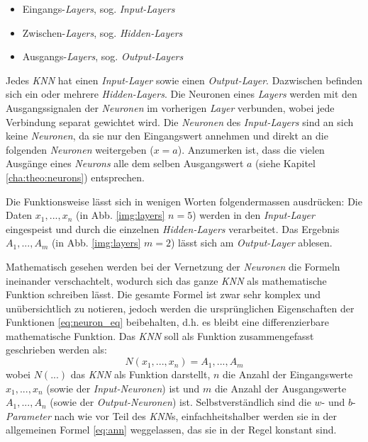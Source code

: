 \begin{itemize}
	\item Eingangs-\textit{Layers}, sog. \textit{Input-Layers}
	\item Zwischen-\textit{Layers}, sog. \textit{Hidden-Layers}
	\item Ausgangs-\textit{Layers}, sog. \textit{Output-Layers}
\end{itemize}
Jedes \textit{KNN} hat einen \textit{Input-Layer} sowie einen \textit{Output-Layer}. Dazwischen befinden sich ein oder mehrere \textit{Hidden-Layers}. Die Neuronen eines \textit{Layers} werden mit den Ausgangssignalen der \textit{Neuronen} im vorherigen \textit{Layer} verbunden, wobei jede Verbindung separat gewichtet wird. Die \textit{Neuronen} des \textit{Input-Layers} sind an sich keine \textit{Neuronen}, da sie nur den Eingangswert annehmen und direkt an die folgenden \textit{Neuronen} weitergeben ($x = a$). Anzumerken ist, dass die vielen Ausgänge eines \textit{Neurons} alle dem selben Ausgangswert $a$ (siehe Kapitel \ref{cha:theo:neurons}) entsprechen. 

Die Funktionsweise lässt sich in wenigen Worten folgendermassen ausdrücken: Die Daten $x_1,...,x_n$ (in Abb. \ref{img:layers} $n=5$) werden in den \textit{Input-Layer} eingespeist und durch die einzelnen \textit{Hidden-Layers} verarbeitet. Das Ergebnis $A_1,...,A_m$ (in Abb. \ref{img:layers} $m=2$) lässt sich am \textit{Output-Layer} ablesen. 

Mathematisch gesehen werden bei der Vernetzung der \textit{Neuronen} die Formeln ineinander verschachtelt, wodurch sich das ganze \textit{KNN} als mathematische Funktion schreiben lässt. Die gesamte Formel ist zwar sehr komplex und unübersichtlich zu notieren, jedoch werden die ursprünglichen Eigenschaften der Funktionen \ref{eq:neuron_eq} beibehalten, d.h. es bleibt eine differenzierbare mathematische Funktion. Das \textit{KNN} soll als Funktion zusammengefasst geschrieben werden als:
\begin{equation}\label{eq:ann}
N(x_1,...,x_n) = A_1,...,A_m
\end{equation}
wobei $N(...)$ das \textit{KNN} als Funktion darstellt, $n$ die Anzahl der Eingangswerte $x_1,...,x_n$ (sowie der \textit{Input-Neuronen}) ist und $m$ die Anzahl der Ausgangswerte $A_1,...,A_n$ (sowie der \textit{Output-Neuronen}) ist. Selbstverständlich sind die $w$- und $b$-\textit{Parameter} nach wie vor Teil des \textit{KNN}s, einfachheitshalber werden sie in der allgemeinen Formel \ref{eq:ann} weggelassen, das sie in der Regel konstant sind.

